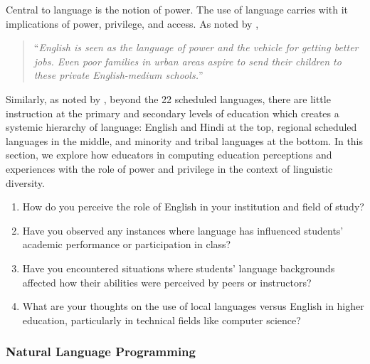 {Central to language is the notion of power. The use of language carries with it
implications of power, privilege, and access. As noted by \citet{jhingran2009hundreds},
\begin{quote}
  ``\textit{English is seen as the language of power and the vehicle for getting better jobs. Even poor families in urban areas aspire to send their children to these private English-medium schools.}''
\end{quote}
Similarly, as noted by \citet{mohanty2017language}, beyond the 22 scheduled
languages, there are little instruction at the primary and secondary levels of
education which creates a systemic hierarchy of language: English and Hindi at
the top, regional scheduled languages in the middle, and minority and tribal
languages at the bottom. In this section, we explore how educators in computing
education perceptions and experiences with the role of power and privilege in
the context of linguistic diversity. 
\begin{enumerate}[label={LDP.\arabic*}, align=left, leftmargin=4em]
  \item How do you perceive the role of English in your institution and
    field of study?
  \item Have you observed any instances where language has influenced students'
    academic performance or participation in class? 
  \item Have you encountered situations where students' language backgrounds
    affected how their abilities were perceived by peers or instructors?
  \item What are your thoughts on the use of local languages versus English in
    higher education, particularly in technical fields like computer science?
\end{enumerate}

\subsubsection{Natural Language Programming}\label{subsubsec:natural-language-programming}

}
